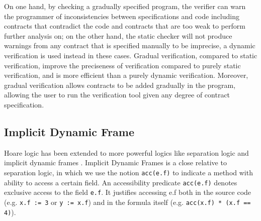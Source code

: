 \documentclass {article}
\begin{document}
On one hand, by checking a gradually specified program, the verifier can warn the programmer of inconsistencies between specifications and code including contracts that contradict the code and contracts that are too weak to perform further analysis on; on the other hand, the static checker will not produce warnings from any contract that is specified manually to be imprecise, a dynamic verification is used instead in these cases. Gradual verification, compared to static verification, improve the preciseness of verification compared to purely static verification, and is more efficient than a purely dynamic verification. Moreover, gradual verification allows contracts to be added gradually in the program, allowing the user to run the verification tool given any degree of contract specification.

\subsection{Implicit Dynamic Frame}
Hoare logic has been extended to more powerful logics like separation logic \cite{p4} and implicit dynamic frames \cite{p5}. Implicit Dynamic Frames is a close relative to separation logic, in which we use the notion \texttt{acc(e.f)} to indicate a method with ability to access a certain field.  An accessibility predicate \texttt{acc(e.f)} denotes exclusive access to the field \texttt{e.f}. It justifies accessing e.f both in the source code (e.g. \texttt{x.f := 3} or \texttt{y := x.f}) and in the formula itself (e.g. \texttt{acc(x.f) * (x.f  == 4)}).\\
\end{document}
